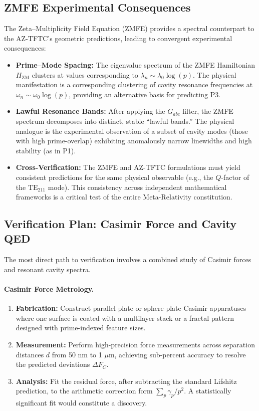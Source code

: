 \documentclass[12]{amsart}
\theoremstyle{plain}
\begin{document}
\subsection{ZMFE Experimental Consequences}

The Zeta–Multiplicity Field Equation (ZMFE) provides a spectral counterpart to the AZ-TFTC's geometric predictions, leading to convergent experimental consequences:

\begin{itemize}
    \item \textbf{Prime–Mode Spacing:}  
    The eigenvalue spectrum of the ZMFE Hamiltonian $H_{\mathrm{ZM}}$ clusters at values corresponding to $\lambda_n \sim \lambda_0 \log(p)$. The physical manifestation is a corresponding clustering of cavity resonance frequencies at $\omega_n \sim \omega_0 \log(p)$, providing an alternative basis for predicting P3.

    \item \textbf{Lawful Resonance Bands:}  
    After applying the $G_{abc}$ filter, the ZMFE spectrum decomposes into distinct, stable ``lawful bands.'' The physical analogue is the experimental observation of a subset of cavity modes (those with high prime-overlap) exhibiting anomalously narrow linewidths and high stability (as in P1).

    \item \textbf{Cross-Verification:}  
    The ZMFE and AZ-TFTC formulations must yield consistent predictions for the same physical observable (e.g., the $Q$-factor of the $\mathrm{TE}_{211}$ mode). This consistency across independent mathematical frameworks is a critical test of the entire Meta-Relativity constitution.
\end{itemize}

\subsection{Verification Plan: Casimir Force and Cavity QED}

The most direct path to verification involves a combined study of Casimir forces and resonant cavity spectra.

\paragraph{Casimir Force Metrology.}
\begin{enumerate}
    \item \textbf{Fabrication:} Construct parallel-plate or sphere-plate Casimir apparatuses where one surface is coated with a multilayer stack or a fractal pattern designed with prime-indexed feature sizes.
    \item \textbf{Measurement:} Perform high-precision force measurements across separation distances $d$ from 50 nm to 1 $\mu$m, achieving sub-percent accuracy to resolve the predicted deviations $\Delta F_C$.
    \item \textbf{Analysis:} Fit the residual force, after subtracting the standard Lifshitz prediction, to the arithmetic correction form $\sum_p \gamma_p / p^2$. A statistically significant fit would constitute a discovery.
\end{enumerate}
\end{document}
